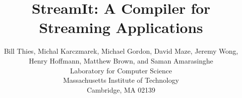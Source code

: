 \documentclass[psfig]{sig-alternate}
\begin{document}
\title{StreamIt: A Compiler for Streaming Applications}


\author{
\alignauthor \vspace{-18pt}
Bill Thies, 
Michal Karczmarek, 
Michael Gordon, 
David Maze, 
Jeremy Wong,
Henry Hoffmann, 
Matthew Brown, 
and Saman Amarasinghe\\
	\vspace{6pt}
	Laboratory for Computer Science \\
	Massachusetts Institute of Technology \\
	Cambridge, MA  02139 \\
}

\newcommand{\ma}[2]{max_{#1 \rightarrow #2}}
\newcommand{\mi}[2]{min_{#1 \leftarrow #2}}
\newcommand{\floor}[2]{\left\lfloor\frac{#1}{#2}\right\rfloor}
\newcommand{\ceil}[2]{\left\lceil\frac{#1}{#2}\right\rceil}
\newtheorem{definition}{Definition}
\newtheorem{theorem}{Theorem}

\newcommand{\ra}[0]{\rightarrow}

\maketitle

\begin{abstract}
%
\end{abstract}

%
%


%
%
%
%
\end{document}
